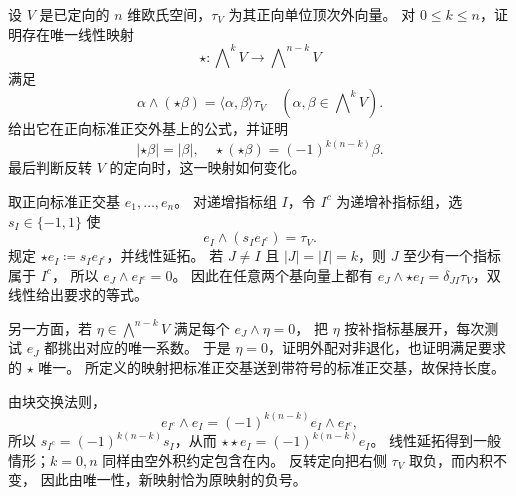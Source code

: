 \begin{exercise}\label{b1:ex:app-b-hodge-linear-map}
设 \(V\) 是已定向的 \(n\) 维欧氏空间，\(\tau_V\) 为其正向单位顶次外向量。
对 \(0\leq k\leq n\)，证明存在唯一线性映射
\[
 \star:\bigwedge\nolimits^kV\longrightarrow
             \bigwedge\nolimits^{n-k}V
\]
满足
\[
 \alpha\wedge(\star\beta)=\langle\alpha,\beta\rangle\tau_V
 \quad(\alpha,\beta\in\bigwedge\nolimits^kV).
\]
给出它在正向标准正交外基上的公式，并证明
\[
 |\star\beta|=|\beta|,\quad
 \star(\star\beta)=(-1)^{k(n-k)}\beta.
\]
最后判断反转 \(V\) 的定向时，这一映射如何变化。
\end{exercise}
\begin{solution}
取正向标准正交基 \(e_1,\ldots,e_n\)。
对递增指标组 \(I\)，令 \(I^c\) 为递增补指标组，选
\(s_I\in\{-1,1\}\) 使
\[
 e_I\wedge(s_Ie_{I^c})=\tau_V.
\]
规定 \(\star e_I\coloneqq s_Ie_{I^c}\)，并线性延拓。
若 \(J\ne I\) 且 \(|J|=|I|=k\)，则 \(J\) 至少有一个指标属于 \(I^c\)，
所以 \(e_J\wedge e_{I^c}=0\)。
因此在任意两个基向量上都有
\(e_J\wedge\star e_I=\delta_{JI}\tau_V\)，双线性给出要求的等式。

另一方面，若 \(\eta\in\bigwedge^{n-k}V\) 满足每个 \(e_J\wedge\eta=0\)，
把 \(\eta\) 按补指标基展开，每次测试 \(e_J\) 都挑出对应的唯一系数。
于是 \(\eta=0\)，证明外配对非退化，也证明满足要求的 \(\star\) 唯一。
所定义的映射把标准正交基送到带符号的标准正交基，故保持长度。

由块交换法则，
\[
 e_{I^c}\wedge e_I=(-1)^{k(n-k)}e_I\wedge e_{I^c},
\]
所以 \(s_{I^c}=(-1)^{k(n-k)}s_I\)，从而
\(\star\star e_I=(-1)^{k(n-k)}e_I\)。
线性延拓得到一般情形；\(k=0,n\) 同样由空外积约定包含在内。
反转定向把右侧 \(\tau_V\) 取负，而内积不变，
因此由唯一性，新映射恰为原映射的负号。
\end{solution}

